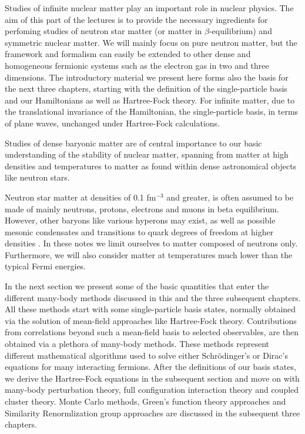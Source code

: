 Studies of infinite nuclear matter play an important role in nuclear
physics. The aim of this part of the lectures is to provide the
necessary ingredients for perfoming studies of neutron star matter (or
matter in $\beta$-equilibrium) and symmetric nuclear matter.  We will
mainly focus on pure neutron matter, but the framework and formalism
can easily be extended to other dense and homogeneous fermionic
systems such as the electron gas in two and three dimensions. The
introductory material we present here forms also the basis for the
next three chapters, starting with the definition of the
single-particle basis and our Hamiltonians as well as Hartree-Fock
theory. For infinite matter, due to the translational invariance of
the Hamiltonian, the single-particle basis, in terms of plane waves,
unchanged under Hartree-Fock calculations.

Studies of dense baryonic matter are of central importance to our
basic understanding of the stability of nuclear matter, spanning from
matter at high densities and temperatures to matter as found within
dense astronomical objects like neutron stars.

Neutron star matter at densities of 0.1 fm$^{-3}$ and greater, is
often assumed to be made of mainly neutrons, protons, electrons and
muons in beta equilibrium. However, other baryons like various
hyperons may exist, as well as possible mesonic condensates and
transitions to quark degrees of freedom at higher densities \cite{hh2000}.  
In these notes we limit ourselves to
matter composed of neutrons only.  Furthermore, we will also
consider matter at temperatures much lower than the typical Fermi
energies.  

In the next section we present some of the basic quantities that enter the different many-body methods 
discussed in this and the three subsequent chapters. All these methods start with some single-particle basis states,
normally obtained via the solution of mean-field approaches like  Hartree-Fock theory. Contributions from 
correlations beyond such a mean-field basis to selected observables, are then obtained
via a plethora of many-body methods. These methods represent different mathematical algorithms used to solve either 
Schr\"{o}dinger's or Dirac's equations for many interacting fermions. After the definitions of our basis states, we derive the Hartree-Fock equations
in the subsequent section and move on with many-body perturbation theory, full configuration interaction theory and coupled cluster theory. 
Monte Carlo methods, Green's function theory approaches and Similarity Renormlization group approaches are discussed in the subsequent three chapters. 

